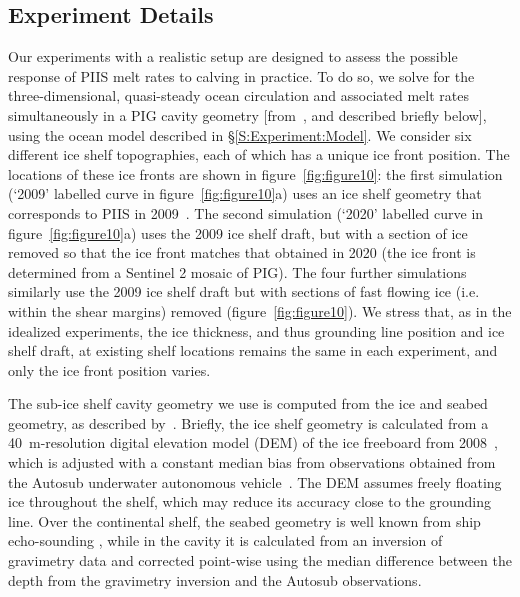 \documentclass[draft]{agujournal2019}
\begin{document}
\subsection{Experiment Details}
Our experiments with a realistic setup are designed to assess the possible response of PIIS melt rates to calving in practice. To do so, we solve for the three-dimensional, quasi-steady ocean circulation and associated melt rates simultaneously in a PIG cavity geometry [from~, and described briefly below], using the ocean model described in \S\ref{S:Experiment:Model}. We consider six different ice shelf topographies, each of which has a unique ice front position. The locations of these ice fronts are shown in figure~\ref{fig:figure10}: the first simulation (`2009' labelled curve in figure~\ref{fig:figure10}a) uses an ice shelf geometry that corresponds to PIIS in 2009~\cite{Dutrieux2014Science}. The second simulation (`2020' labelled curve in figure~\ref{fig:figure10}a) uses the 2009 ice shelf draft, but with a section of ice removed so that the ice front matches that obtained in 2020 (the ice front is determined from a Sentinel 2 mosaic of PIG). The four further simulations similarly use the 2009 ice shelf draft but with sections of fast flowing ice (i.e. within the shear margins) removed (figure~\ref{fig:figure10}). We stress that, as in the idealized experiments, the ice thickness, and thus grounding line position and ice shelf draft, at existing shelf locations remains the same in each experiment, and only the ice front position varies.

The sub-ice shelf cavity geometry we use is computed from the ice and seabed geometry, as described by~. Briefly, the ice shelf geometry is calculated from a 40~m-resolution digital elevation model (DEM) of the ice freeboard from 2008~\cite{Korona2009Photogrammetry}, which is adjusted with a constant median bias from observations obtained from the Autosub underwater autonomous vehicle~\cite{Jenkins2010NatureGeo}. The DEM assumes freely floating ice throughout the shelf, which may reduce its accuracy close to the grounding line. Over the continental shelf, the seabed geometry is well known from ship echo-sounding \cite{Dutrieux2014Science}, while in the cavity it is calculated from an inversion of gravimetry data and corrected point-wise using the median difference between the depth from the gravimetry inversion and the Autosub observations.
\end{document}
